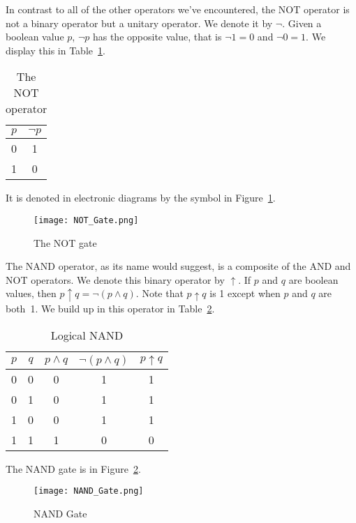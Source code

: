 In contrast to all of the other operators we've encountered, the NOT operator is not a binary operator but a unitary operator.  We denote it by $\neg$.  Given a boolean value $p$, $\neg p$ has the opposite value, that is $\neg 1 = 0$ and $\neg 0 = 1$. We display this in Table~\ref{table:not_operator}.
\begin{table}
		\begin{center}
	\begin{tabular}{cc}
		$p$ & $\neg p$ \\ \hline 
		0   & 1  \\ 
		1   & 0  
	\end{tabular}
\end{center}
\caption{The NOT operator}\label{table:not_operator}
\end{table}
It is denoted in electronic diagrams by the symbol in Figure~\ref{figure:not_gate}.
\begin{figure}
		\begin{center} 
		\texttt{[image: NOT\_Gate.png]}
		\end{center} 	
	\caption{The NOT gate}\label{figure:not_gate}
\end{figure}

The NAND operator, as its name would suggest, is a composite of the AND and NOT operators.  We denote this binary operator by $\uparrow$.  If $p$ and $q$ are boolean values, then $p\uparrow q = \neg (p \wedge q)$.  Note that $p\uparrow q$ is 1 except when $p$ and $q$ are both~1.  We build up in this operator in Table~\ref{table:logical_nand}.
\begin{table}
		\begin{center}
	\begin{tabular}{ccccc}
		$p$ & $q$ & $p\wedge q$ & $\neg (p\wedge q)$ & $p\uparrow q$   \\ \hline
		0  &   0   &    0          &        1        & 1            \\
		0  &   1   &    0          &        1        & 1            \\
		1  &   0   &    0          &        1        & 1            \\
		1  &   1   &    1          &        0        & 0            \\
	\end{tabular}
\caption{Logical NAND}\label{table:logical_nand}
\end{center}	
\end{table}
The NAND gate is in Figure~\ref{figure:nand_gate}.
\begin{figure}
		\begin{center}
		\texttt{[image: NAND\_Gate.png]}
		\end{center}
	\caption{NAND Gate}\label{figure:nand_gate}
\end{figure}

